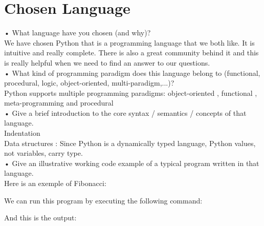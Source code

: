 \section{Chosen Language}
• What language have you chosen (and why)?\\
We have chosen Python that is a programming language that we both like. It is intuitive and really complete. There is also a great community behind it and this is really helpful when we need to find an answer to our questions.\\

• What kind of programming paradigm does this language belong to (functional, procedural, logic, object-oriented, multi-paradigm,...)?\\
Python supports multiple programming paradigms: object-oriented \cite{martelli2006python} \cite{functional_doc}, functional \cite{devtome} \cite{functional_doc}, meta-programming \cite{mihai} and procedural \cite{martelli2006python} \cite{functional_doc}\\

• Give a brief introduction to the core syntax / semantics / concepts of that language.\\
Indentation\\
Data structures : Since Python is a dynamically typed language, Python values, not variables, carry type.\\

• Give an illustrative working code example of a typical program written in that language.\\
Here is an exemple of Fibonacci:


We can run this program by executing the following command:


And this is the output:


